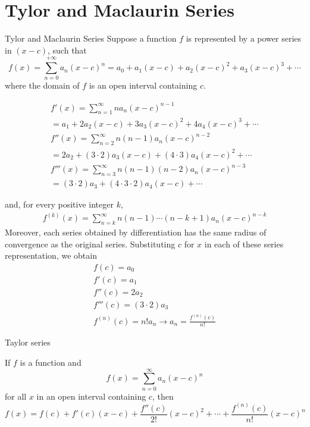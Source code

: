 \documentclass[newPxFont]{beamer}
\begin{document}
\section{Tylor and Maclaurin Series}
\begin{frame}{Tylor and Maclaurin Series}
  Suppose a function $f$ is represented by a power series in $(x-c)$, such that
  \begin{equation}
    f(x)=\sum_{n=0}^{+\infty}a_n (x-c)^n=a_0+a_1(x-c)+a_2(x-c)^2+a_3(x-c)^3+\cdots
  \end{equation}
where the domain of $f$ is an open interval containing $c$.
\end{frame}

\begin{frame}
  \begin{eqnarray}
    f'(x)=\sum_{n=1}^\infty na_n(x-c)^{n-1}\\\nonumber
    =a_1+2a_2(x-c)+3a_3(x-c)^2+4a_4(x-c)^3+\cdots\\
    f''(x)=\sum_{n=2}^\infty n(n-1)a_n(x-c)^{n-2}\\\nonumber
    =2a_2+(3\cdot2)a_3(x-c)+(4\cdot3)a_4(x-c)^2+\cdots\\
    f'''(x)=\sum_{n=3}^\infty n(n-1)(n-2)a_n(x-c)^{n-3}\\\nonumber
    =(3\cdot2)a_3+(4\cdot3\cdot2)a_4(x-c)+\cdots
  \end{eqnarray}
\end{frame}

\begin{frame}
  and, for every positive integer $k$,
  \begin{eqnarray}
    f^{(k)}(x)=\sum_{n=k}^{\infty} n(n-1)\cdots(n-k+1)a_n(x-c)^{n-k}
  \end{eqnarray}
  Moreover, each series obtained by differentiation has the same radius of convergence as the original series. Substituting $c$ for $x$ in each of these series representation, we obtain
  \begin{eqnarray}
    f(c)=a_0\\
    f'(c)=a_1\\
    f''(c)=2a_2\\
    f'''(c)=(3\cdot2)a_3\\
    f^{(n)}(c)=n!a_n \to a_n=\frac{f^{(n)}(c)}{n!}
  \end{eqnarray}
\end{frame}

\begin{frame}{Taylor series}
\begin{theorem}
  If $f$ is a function and
  \begin{equation}
    f(x)=\sum_{n=0}^\infty a_n(x-c)^n
  \end{equation}
  for all $x$ in an open interval containing $c$, then
  \begin{equation}
    f(x)=f(c)+f'(c)(x-c)+\frac{f''(c)}{2!}(x-c)^2+\cdots+\frac{f^{(n)}(c)}{n!}(x-c)^n
  \end{equation}
\end{theorem}
\end{frame}
\end{document}
